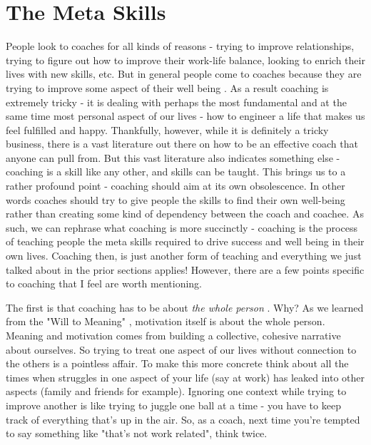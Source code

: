 \documentclass[11pt]{book}
\begin{document}
\section{The Meta Skills}
People look to coaches for all kinds of reasons - trying to improve relationships, trying to figure out how to improve their work-life balance, looking to enrich their lives with new skills, etc. But in general people come to coaches because they are trying to improve some aspect of their well being \cite{coactive}. As a result coaching is extremely tricky - it is dealing with perhaps the most fundamental and at the same time most personal aspect of our lives - how to engineer a life that makes us feel fulfilled and happy. Thankfully, however, while it is definitely a tricky business, there is a vast literature out there on how to be an effective coach that anyone can pull from. But this vast literature also indicates something else - coaching is a skill like any other, and skills can be taught. This brings us to a rather profound point - coaching should aim at its own obsolescence. In other words coaches should try to give people the skills to find their own well-being rather than creating some kind of dependency between the coach and coachee. As such, we can rephrase what coaching is more succinctly - coaching is the process of teaching people the meta skills required to drive success and well being in their own lives. Coaching then, is just another form of teaching and everything we just talked about in the prior sections applies! However, there are a few points specific to coaching that I feel are worth mentioning.
\newline

The first is that coaching has to be about \textit{the whole person} \cite{coactive}. Why? As we learned from the "Will to Meaning" \cite{frankl}, motivation itself is about the whole person. Meaning and motivation comes from building a collective, cohesive narrative about ourselves. So trying to treat one aspect of our lives without connection to the others is a pointless affair. To make this more concrete think about all the times when struggles in one aspect of your life (say at work) has leaked into other aspects (family and friends for example). Ignoring one context while trying to improve another is like trying to juggle one ball at a time - you have to keep track of everything that's up in the air. So, as a coach, next time you're tempted to say something like "that's not work related", think twice.
\newline
\end{document}

